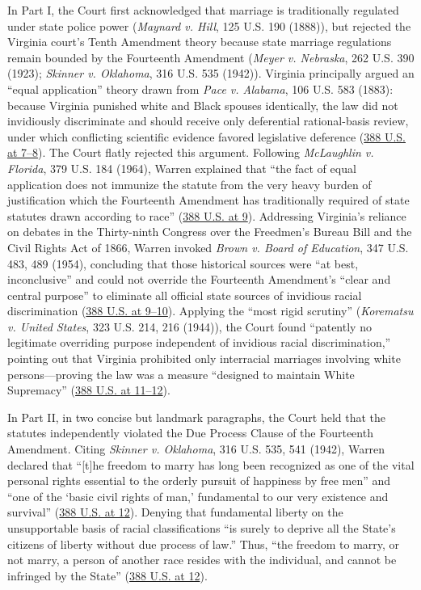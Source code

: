 \documentclass[12pt]{article}
\begin{document}
In Part I, the Court first acknowledged that marriage is traditionally regulated under state police power (\textit{Maynard v. Hill}, 125 U.S. 190 (1888)), but rejected the Virginia court's Tenth Amendment theory because state marriage regulations remain bounded by the Fourteenth Amendment (\textit{Meyer v. Nebraska}, 262 U.S. 390 (1923); \textit{Skinner v. Oklahoma}, 316 U.S. 535 (1942)). Virginia principally argued an ``equal application'' theory drawn from \textit{Pace v. Alabama}, 106 U.S. 583 (1883): because Virginia punished white and Black spouses identically, the law did not invidiously discriminate and should receive only deferential rational-basis review, under which conflicting scientific evidence favored legislative deference (\href{https://supreme.justia.com/cases/federal/us/388/1/}{388 U.S. at 7--8}). The Court flatly rejected this argument. Following \textit{McLaughlin v. Florida}, 379 U.S. 184 (1964), Warren explained that ``the fact of equal application does not immunize the statute from the very heavy burden of justification which the Fourteenth Amendment has traditionally required of state statutes drawn according to race'' (\href{https://supreme.justia.com/cases/federal/us/388/1/}{388 U.S. at 9}). Addressing Virginia's reliance on debates in the Thirty-ninth Congress over the Freedmen's Bureau Bill and the Civil Rights Act of 1866, Warren invoked \textit{Brown v. Board of Education}, 347 U.S. 483, 489 (1954), concluding that those historical sources were ``at best, inconclusive'' and could not override the Fourteenth Amendment's ``clear and central purpose'' to eliminate all official state sources of invidious racial discrimination (\href{https://supreme.justia.com/cases/federal/us/388/1/}{388 U.S. at 9--10}). Applying the ``most rigid scrutiny'' (\textit{Korematsu v. United States}, 323 U.S. 214, 216 (1944)), the Court found ``patently no legitimate overriding purpose independent of invidious racial discrimination,'' pointing out that Virginia prohibited only interracial marriages involving white persons---proving the law was a measure ``designed to maintain White Supremacy'' (\href{https://supreme.justia.com/cases/federal/us/388/1/}{388 U.S. at 11--12}).

In Part II, in two concise but landmark paragraphs, the Court held that the statutes independently violated the Due Process Clause of the Fourteenth Amendment. Citing \textit{Skinner v. Oklahoma}, 316 U.S. 535, 541 (1942), Warren declared that ``[t]he freedom to marry has long been recognized as one of the vital personal rights essential to the orderly pursuit of happiness by free men'' and ``one of the `basic civil rights of man,' fundamental to our very existence and survival'' (\href{https://supreme.justia.com/cases/federal/us/388/1/}{388 U.S. at 12}). Denying that fundamental liberty on the unsupportable basis of racial classifications ``is surely to deprive all the State's citizens of liberty without due process of law.'' Thus, ``the freedom to marry, or not marry, a person of another race resides with the individual, and cannot be infringed by the State'' (\href{https://supreme.justia.com/cases/federal/us/388/1/}{388 U.S. at 12}).
\end{document}
